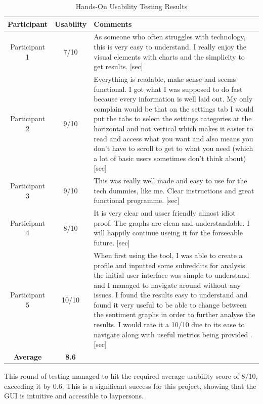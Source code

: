         \FloatBarrier
        \begin{table}[ht]
            \centering
            \caption{Hands-On Usability Testing Results}
            \label{tab:hands_on_usability_testing}
            \begin{tabular}{c|c|p{8cm}}
                \textbf{Participant} & \textbf{Usability} & \textbf{Comments} \\
                \hline\hline
                Participant 1 & 7/10 & As someone who often struggles with technology, this is very easy to understand. I really enjoy the visual elements with charts and the simplicity to get results. [sec] \\ \hline
                Participant 2 & 9/10 & Everything is readable, make sense and seems functional. I got what I was supposed to do fast because every information is well laid out. My only complain would be that on the settings tab I would put the tabs to select the settings categories at the horizontal and not vertical which makes it easier to read and access what you want and also means you don't have to scroll to get to what you need (which a lot of basic users sometimes don't think about) [sec] \\ \hline
                Participant 3 & 9/10 & This was really well made and easy to use for the tech dummies, like me. Clear instructions and great functional programme. [sec] \\ \hline
                Participant 4 & 8/10 & It is very clear and usser friendly almost idiot proof. The graphs are clean and understandable. I will happily continue useing it for the forseeable future. [sec] \\ \hline
                Participant 5 & 10/10 & When first using the tool, I was able to create a profile and inputted some subreddits for analysis. the initial user interface was simple to understand and I managed to navigate around without any issues. I found the results easy to understand and found it very useful to be able to change between the sentiment graphs in order to further analyse the results. I would rate it a 10/10 due to its ease to navigate along with useful metrics being provided . [sec] \\
                \hline\hline
                \textbf{Average} & \textbf{8.6} & \\
            \end{tabular}
        \end{table}
        \FloatBarrier

        This round of testing managed to hit the required average usability score of 8/10, exceeding it by 0.6. This is a significant success for this project, showing that the GUI is intuitive and accessible to laypersons.

